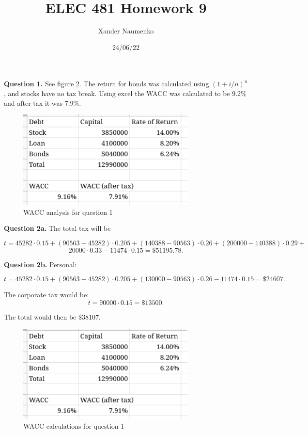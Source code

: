 \documentclass[letterpaper, reqno,11pt]{article}
\begin{document}
\title{ELEC 481 Homework 9}
\date{24/06/22}
\author{Xander Naumenko}
\maketitle

{\noindent\bf Question 1.} See figure \ref{fig:q1}. The return for bonds was calculated using $(1+i/n)^n$, and stocks have no tax break. Using excel the WACC was calculated to be 9.2\% and after tax it was 7.9\%. 

\begin{figure}[htpb]
    \centering
    \includegraphics[width=0.8\textwidth]{q1}
    \caption{WACC analysis for question 1}
    \label{fig:q1}
\end{figure}

{\noindent\bf Question 2a.} The total tax will be 

\[
t=45282\cdot 0.15+(90563-45282)\cdot 0.205+(140388-90563)\cdot 0.26+(200000-140388)\cdot 0.29+
\]
\[
20000\cdot 0.33-11474\cdot 0.15=\$51195.78
.\]

{\noindent\bf Question 2b.} Personal: 

\[
t=45282\cdot 0.15+(90563-45282)\cdot 0.205+(130000-90563)\cdot 0.26-11474\cdot 0.15=\$24607
.\]

The corporate tax would be: 
\[
t=90000\cdot 0.15=\$13500
.\]

The total would then be $\$38107$. 

\begin{figure}[htpb]
    \centering
    \includegraphics[width=0.8\textwidth]{q1}
    \caption{WACC calculations for question 1}
    \label{fig:q1}
\end{figure}
\end{document}
